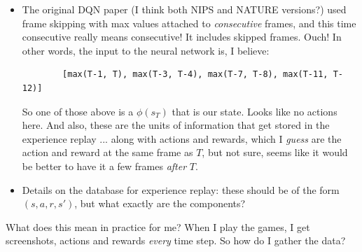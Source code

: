 \documentclass[letterpaper, 10pt, conference]{ieeeconf}
\begin{document}
\begin{itemize}
        \item The original DQN paper (I think both NIPS and NATURE versions?)
        used frame skipping with max values attached to \emph{consecutive}
        frames, and this time consecutive really means consecutive! It includes
        skipped frames. Ouch! In other words, the input to the neural network
        is, I believe:
        \begin{verbatim}
        [max(T-1, T), max(T-3, T-4), max(T-7, T-8), max(T-11, T-12)]
        \end{verbatim}
        So one of those above is a $\phi(s_T)$ that is our state. Looks like no
        actions here. And also, these are the units of information that get
        stored in the experience replay ... along with actions and rewards,
        which I \emph{guess} are the action and reward at the same frame as $T$,
        but not sure, seems like it would be better to have it a few frames
        \emph{after} $T$.

        \item Details on the database for experience replay: these should be of
        the form $(s,a,r,s')$, but what exactly are the components?
    \end{itemize}

    What does this mean in practice for me? When I play the games, I get
    screenshots, actions and rewards \emph{every} time step. So how do I gather
    the data?
\end{document}
